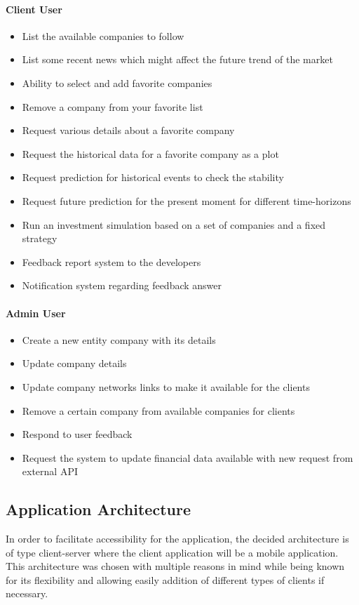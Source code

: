\paragraph{Client User}
\begin{itemize}
    \item List the available companies to follow
    \item List some recent news which might affect the future trend of the market
    \item Ability to select and add favorite companies
    \item Remove a company from your favorite list
    \item Request various details about a favorite company
    \item Request the historical data for a favorite company as a plot
    \item Request prediction for historical events to check the stability
    \item Request future prediction for the present moment for different time-horizons
    \item Run an investment simulation based on a set of companies and a fixed strategy
    \item Feedback report system to the developers
    \item Notification system regarding feedback answer
\end{itemize}

\paragraph{Admin User}
\begin{itemize}
    \item Create a new entity company with its details
    \item Update company details
    \item Update company networks links to make it available for the clients
    \item Remove a certain company from available companies for clients
    \item Respond to user feedback
    \item Request the system to update financial data available with new request from external API
\end{itemize}

\subsection{Application Architecture}
In order to facilitate accessibility for the application, the decided architecture is of type client-server where the client application will be a mobile application. This architecture was chosen with multiple reasons in mind while being known for its flexibility and allowing easily addition of different types of clients if necessary.

